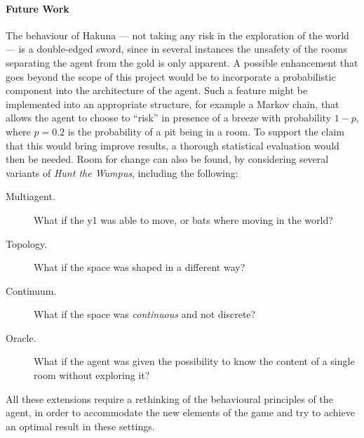 \documentclass{llncs}
\newcommand{\htw}{\emph{Hunt the Wumpus}\xspace}
\begin{document}
\paragraph{Future Work} The behaviour of Hakuna --- not taking any risk in the exploration of the world --- is a double-edged sword, since in several instances the unsafety of the rooms separating the agent from the gold is only apparent.
A possible enhancement that goes beyond the scope of this project would be to incorporate a probabilistic component into the architecture of the agent.
Such a feature might be implemented into an appropriate structure, for example a Markov chain, that allows the agent to choose to \enquote{risk} in presence of a breeze with probability $1 - p$, where $p = 0.2$ is the probability of a pit being in a room.
To support the claim that this would bring improve results, a thorough statistical evaluation would then be needed.
Room for change can also be found, by considering several variants of \htw, including the following:
\begin{description}
	\item[Multiagent.] What if the y1 was able to move, or bats where moving in the world?
	\item[Topology.] What if the space was shaped in a different way?
	\item[Continuum.] What if the space was \emph{continuous} and not discrete?
	\item[Oracle.] What if the agent was given the possibility to know the content of a single room without exploring it?
\end{description}
All these extensions require a rethinking of the behavioural principles of the agent, in order to accommodate the new elements of the game and try to achieve an optimal result in these settings.



\newpage
{}
\appendix
\footnotesize

\begin{multicols}{2}

\end{multicols}
\end{document}
